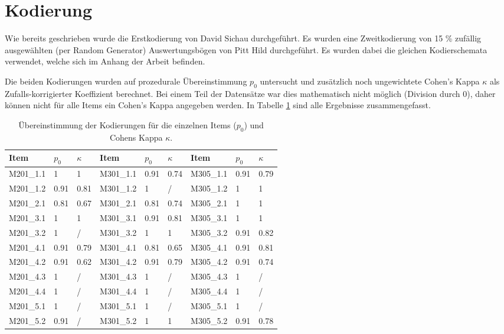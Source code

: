 \section{Kodierung}

Wie bereits geschrieben wurde die Erstkodierung von David Sichau durchgeführt. Es wurden eine Zweitkodierung von  15 \% zufällig ausgewählten (per Random Generator) Auswertungsbögen von Pitt Hild  durchgeführt. Es wurden dabei die gleichen Kodierschemata verwendet, welche sich im Anhang der Arbeit befinden. %

Die beiden Kodierungen wurden auf prozedurale Übereinstimmung $p_0$ untersucht und zusätzlich noch ungewichtete Cohen's Kappa $\kappa$ als Zufalls-korrigierter Koeffizient berechnet. Bei einem Teil der Datensätze war dies mathematisch nicht möglich (Division durch 0), daher können nicht für alle Items ein Cohen's Kappa angegeben werden. In Tabelle \ref{tab:CohenKappa} sind alle Ergebnisse zusammengefasst.



\begin{table}[htbp]
  \centering
\begin{tabular}{|l|l|l||l|l|l||l|l|l|}
\hline Item & $p_0$ & $\kappa$ & Item & $p_0$ & $\kappa$ & Item & $p_0$ & $\kappa$\\
\hline M201\_1.1 & 1 & 1 & 			M301\_1.1 & 0.91 & 0.74 & 	M305\_1.1 & 0.91 & 0.79 \\ 
\hline M201\_1.2 & 0.91 & 0.81 &	M301\_1.2 & 1 & / & 		M305\_1.2 & 1 & 1 \\ 
\hline M201\_2.1 & 0.81 & 0.67 & 	M301\_2.1 & 0.81 & 0.74 & 	M305\_2.1 & 1 & 1\\ 
\hline M201\_3.1 & 1 & 1 & 			M301\_3.1 & 0.91 & 0.81 & 	M305\_3.1 & 1 & 1\\ 
\hline M201\_3.2 & 1 & / & 			M301\_3.2 & 1 & 1 & 		M305\_3.2 & 0.91 & 0.82\\ 
\hline M201\_4.1 & 0.91 & 0.79 & 	M301\_4.1 & 0.81 & 0.65 & 	M305\_4.1 & 0.91 & 0.81 \\ 
\hline M201\_4.2 & 0.91 & 0.62 & 	M301\_4.2 & 0.91 & 0.79 & 	M305\_4.2 & 0.91 & 0.74 \\ 
\hline M201\_4.3 & 1 & / & 			M301\_4.3 & 1 & / & 		M305\_4.3 & 1 & / \\ 
\hline M201\_4.4 & 1 & / & 			M301\_4.4 & 1 & / & 		M305\_4.4 & 1 & / \\ 
\hline M201\_5.1 & 1 & / & 			M301\_5.1 & 1 & / & 		M305\_5.1 & 1 & / \\ 
\hline M201\_5.2 & 0.91 & / & 		M301\_5.2 & 1 & 1 & 		M305\_5.2 & 0.91 & 0.78 \\ 

\hline 
\end{tabular} 
  \caption{Übereinstimmung der Kodierungen für die einzelnen Items ($p_0$) und Cohens Kappa $\kappa$.}
  \label{tab:CohenKappa}
\end{table}

